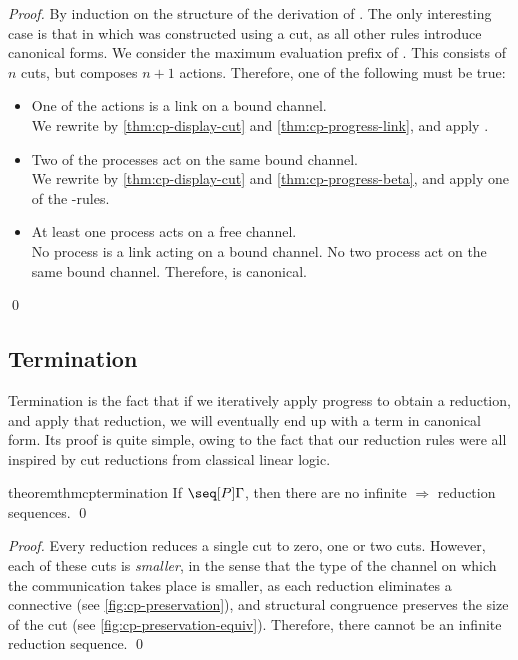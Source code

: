 \documentclass[UKenglish]{llncs}
\begin{document}
\begin{proof}
  By induction on the structure of the derivation of \seq[P]{\Gamma}.
  The only interesting case is that in which  was constructed using a cut,
  as all other rules introduce canonical forms.
  We consider the maximum evaluation prefix  of . This consists of
  $n$ cuts, but composes $n+1$ actions. Therefore, one of the following must be
  true:
  \begin{itemize}
  \item
    One of the actions is a link on a bound channel.\\
    We rewrite by \cref{thm:cp-display-cut} and \cref{thm:cp-progress-link},
    and apply .
  \item
    Two of the processes act on the same bound channel.\\
    We rewrite by \cref{thm:cp-display-cut} and \cref{thm:cp-progress-beta},
    and apply one of the \textbeta-rules.
  \item
    At least one process acts on a free channel.\\
    No process is a link acting on a bound channel. No two process act on the
    same bound channel. Therefore,  is canonical.
  \end{itemize}
  \qed
\end{proof}

\subsection{Termination}
\label{sec:cp-termination}
Termination is the fact that if we iteratively apply progress to obtain a
reduction, and apply that reduction, we will eventually end up with a term in
canonical form.
Its proof is quite simple, owing to the fact that our reduction rules were all
inspired by cut reductions from classical linear logic.
\begin{restatable}[Termination]{theorem}{thmcptermination}\label{thm:cp-termination}
  If $\seq[{ P }]{ \Gamma }$, then there are no infinite $\Longrightarrow$
  reduction sequences.
  \qed
\end{restatable}
\begin{proof}
  Every reduction reduces a single cut to zero, one or two cuts.
  However, each of these cuts is \emph{smaller}, in the sense that the type of
  the channel on which the communication takes place is smaller, as each
  reduction eliminates a connective (see \cref{fig:cp-preservation}), and
  structural congruence preserves the size of the cut (see
  \cref{fig:cp-preservation-equiv}). 
  Therefore, there cannot be an infinite reduction sequence.
  \qed
\end{proof}
\end{document}
